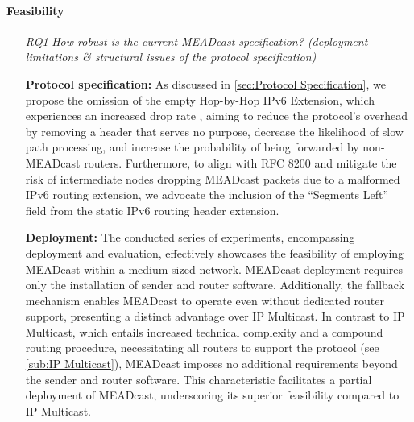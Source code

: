 \paragraph{Feasibility} %
\label{par:discussion_Feasibility}
\begin{itemize}
\item[\textit{RQ1}]
    \textit{How robust is the current MEADcast specification? (deployment
        limitations \& structural issues of the protocol specification)}\par
    \textbf{Protocol specification:}
    As discussed in \autoref{sec:Protocol Specification}, we propose the
        omission of the empty Hop-by-Hop IPv6 Extension, which experiences an
        increased drop rate \cite{rfc7872_ext_hdrs_drop_rate}, aiming to reduce
        the protocol's overhead by removing a header that serves no purpose,
        decrease the likelihood of slow path processing, and increase the
        probability of being forwarded by non-MEADcast routers.
    Furthermore, to align with RFC 8200 \cite{rfc8200_ipv6_hdr} and mitigate
        the risk of intermediate nodes dropping MEADcast packets due to a
        malformed IPv6 routing extension, we advocate the inclusion of the
        ``Segments Left'' field from the static IPv6 routing header extension.

    \textbf{Deployment:}
    The conducted series of experiments, encompassing deployment and evaluation,
        effectively showcases the feasibility of employing MEADcast within a
        medium-sized network.
    MEADcast deployment requires only the installation of sender and router
        software.
    Additionally, the fallback mechanism enables MEADcast to operate even
        without dedicated router support, presenting a distinct advantage over
        IP Multicast.
    In contrast to IP Multicast, which entails increased technical complexity
        and a compound routing procedure, necessitating all routers to support
        the protocol (see \autoref{sub:IP Multicast}), MEADcast imposes no
        additional requirements beyond the sender and router software.
    This characteristic facilitates a partial deployment of MEADcast,
        underscoring its superior feasibility compared to IP Multicast.


\end{itemize}
